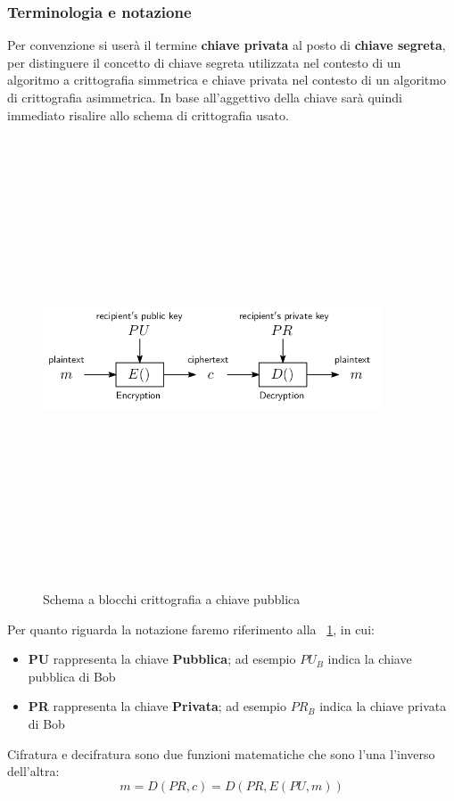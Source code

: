 \subsubsection{Terminologia e notazione}
Per convenzione si userà il termine \textbf{chiave privata} al posto di \textbf{chiave segreta}, per distinguere il concetto di chiave segreta utilizzata nel contesto di un algoritmo a crittografia simmetrica e chiave privata nel contesto di un algoritmo di crittografia asimmetrica. In base all'aggettivo della chiave sarà quindi immediato risalire allo schema di crittografia usato.
\begin{figure}[htbp]
	\centering%
	\subfigure%
	{\includegraphics[height=13cm, width=10cm, keepaspectratio]{Immagini/chiave_pubblica/chiave_pubblica_schema.png}}
	\caption{Schema a blocchi crittografia a chiave pubblica \label{fig:pubblica_schema_blocchi}} 	
\end{figure}
Per quanto riguarda la notazione faremo riferimento alla \figurename~\ref{fig:pubblica_schema_blocchi}, in cui:
\begin{itemize}
	\item \textbf{PU} rappresenta la chiave \textbf{Pubblica}; ad esempio $PU_B$ indica la chiave pubblica di Bob
	\item \textbf{PR} rappresenta la chiave \textbf{Privata}; ad esempio $PR_B$ indica la chiave privata di Bob
\end{itemize}
Cifratura e decifratura sono due funzioni matematiche che sono l'una l'inverso dell'altra:
\begin{equation}
m = D(PR, c) = D(PR, E (PU, m))
\end{equation}

